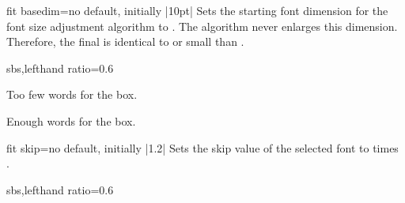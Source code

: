 \begin{docTcbKey}{fit basedim}{=}{no default, initially |10pt|}
  Sets the starting font dimension for the font size adjustment algorithm
  to . The algorithm never enlarges this dimension.
  Therefore, the final  is identical to or small than
  .

\begin{dispExample*}{sbs,lefthand ratio=0.6}

\begin{tcolorbox}[fit to=4cm and 2cm]
  Too few words for the box.
\end{tcolorbox}

\begin{tcolorbox}[fit to=4cm and 2cm,
  fit basedim=50pt]
  Enough words for the box.
\end{tcolorbox}
\end{dispExample*}
\end{docTcbKey}


\begin{docTcbKey}{fit skip}{=}{no default, initially |1.2|}
  Sets the skip value of the selected font to  times .

\begin{dispExample*}{sbs,lefthand ratio=0.6}

\begin{tcolorbox}[fit to=5cm and 4cm,
  fit skip=1.0  ]
  \lipsum[1]
\end{tcolorbox}
\end{dispExample*}
\end{docTcbKey}



